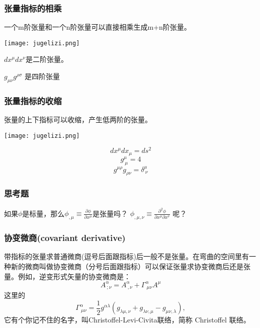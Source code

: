 \documentclass[CJK,13pt]{beamer}
\begin{document}
\begin{frame}
\frametitle{ 张量指标的相乘}

一个m阶张量和一个n阶张量可以直接相乘生成m+n阶张量。

{\vskip 0.1in}

\begin{minipage}{0.3\textwidth}
\texttt{[image: jugelizi.png]}
\end{minipage}
\begin{minipage}{0.6\textwidth}

$dx^\mu dx^\nu$是二阶张量。

$g_{\mu\nu}g^{\rho\sigma}$ 是四阶张量

\end{minipage}
\end{frame}



\begin{frame}
\frametitle{ 张量指标的收缩}

张量的上下指标可以收缩，产生低两阶的张量。

{\vskip 0.1in}

\begin{minipage}{0.3\textwidth}
\texttt{[image: jugelizi.png]}
\end{minipage}
\begin{minipage}{0.6\textwidth}
$$dx^\mu dx_\mu = ds^2$$
$$g^{\mu}_{\ \mu} = 4$$
$$g^{\mu\rho}g_{\rho\nu} = \delta^{\mu}_{\ \nu}$$
\end{minipage}
\end{frame}


\begin{frame}
\frametitle{思考题}

如果$\phi$是标量，那么$\phi_{,\mu} \equiv \frac{\partial \phi}{\partial x^\mu}$是张量吗？ $\phi_{,\mu,\nu}\equiv \frac{\partial^2 \phi}{\partial x^\mu\partial x^\nu}$ 呢？
\end{frame}



\begin{frame}
  \frametitle{协变微商(covariant derivative)}
  带指标的张量求普通微商(逗号后面跟指标)后一般不是张量。在弯曲的空间里有一种新的微商叫做{\blue 协变微商}（分号后面跟指标）可以保证张量求协变微商后还是张量。例如，逆变形式矢量的协变微商是：
  $$A^\alpha_{\ ;\nu} = A^\alpha_{\ ,\nu}+\Gamma^\alpha_{\ \mu\nu}A^\mu $$
  这里的
  {\blue  $$\Gamma^\alpha_{\ \mu\nu}=\frac{1}{2}g^{\alpha\lambda}\left(g_{\lambda\mu,\nu}+g_{\lambda\nu,\mu}-g_{\mu\nu,\lambda}\right),$$}
  它有个你记不住的名字，叫{\blue Christoffel-Levi-Civita联络，简称 Christoffel 联络}。
  \emini
  \emini
  
  
\end{frame}
\end{document}
